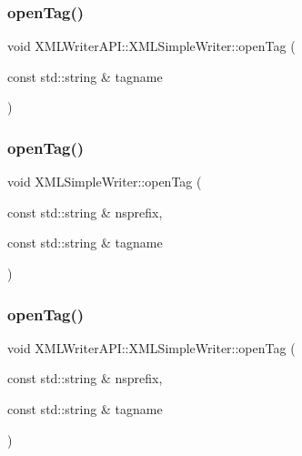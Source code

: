 \subsubsection{\texorpdfstring{openTag()}{openTag()}\hspace{0.1cm}{\footnotesize\ttfamily [2/8]}}
{\footnotesize\ttfamily void X\+M\+L\+Writer\+A\+P\+I\+::\+X\+M\+L\+Simple\+Writer\+::open\+Tag (\begin{DoxyParamCaption}\item[{const std\+::string \&}]{tagname }\end{DoxyParamCaption})}

\mbox{\label{classXMLWriterAPI_1_1XMLSimpleWriter_a8bd5ba895fcb91e18677bd8789ace73a}} 
\subsubsection{\texorpdfstring{openTag()}{openTag()}\hspace{0.1cm}{\footnotesize\ttfamily [3/8]}}
{\footnotesize\ttfamily void X\+M\+L\+Simple\+Writer\+::open\+Tag (\begin{DoxyParamCaption}\item[{const std\+::string \&}]{nsprefix,  }\item[{const std\+::string \&}]{tagname }\end{DoxyParamCaption})}

\mbox{\label{classXMLWriterAPI_1_1XMLSimpleWriter_aabef4c9b78d0f9528a0fa0989df1e22e}} 
\subsubsection{\texorpdfstring{openTag()}{openTag()}\hspace{0.1cm}{\footnotesize\ttfamily [4/8]}}
{\footnotesize\ttfamily void X\+M\+L\+Writer\+A\+P\+I\+::\+X\+M\+L\+Simple\+Writer\+::open\+Tag (\begin{DoxyParamCaption}\item[{const std\+::string \&}]{nsprefix,  }\item[{const std\+::string \&}]{tagname }\end{DoxyParamCaption})}

